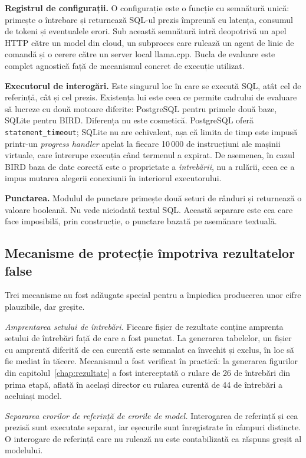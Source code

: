 \documentclass[12pt,a4paper]{report}
\newcommand{\code}[1]{\texttt{\small #1}}
\begin{document}
\textbf{Registrul de configurații.} O configurație este o funcție cu semnătură unică:
primește o întrebare și returnează SQL-ul prezis împreună cu latența,
consumul de tokeni și eventualele erori. Sub această semnătură intră
deopotrivă un apel HTTP către un model din cloud, un subproces care
rulează un agent de linie de comandă și o cerere către un server local
llama.cpp. Bucla de evaluare este complet agnostică față de mecanismul concret de execuție utilizat.

\textbf{Executorul de interogări.} Este singurul loc în care se execută SQL,
atât cel de referință, cât și cel prezis. Existența lui este ceea ce permite
cadrului de evaluare să lucreze cu două motoare diferite: PostgreSQL pentru
primele două baze, SQLite pentru BIRD. Diferența nu este cosmetică. PostgreSQL
oferă \code{statement\_timeout}; SQLite nu are echivalent, așa că limita de
timp este impusă printr-un \emph{progress handler} apelat la fiecare 10\,000 de
instrucțiuni ale mașinii virtuale, care întrerupe execuția când termenul a
expirat. De asemenea, în cazul BIRD baza de date corectă este o proprietate
a \emph{întrebării}, nu a rulării, ceea ce a impus mutarea alegerii
conexiunii în interiorul executorului.

\textbf{Punctarea.} Modulul de punctare primește două seturi de rânduri și
returnează o valoare booleană. Nu vede niciodată textul SQL. Această
separare este cea care face imposibilă, prin construcție, o punctare bazată
pe asemănare textuală.

\subsection{Mecanisme de protecție împotriva rezultatelor false}

Trei mecanisme au fost adăugate special pentru a împiedica producerea unor
cifre plauzibile, dar greșite.

\emph{Amprentarea setului de întrebări.} Fiecare fișier de rezultate
conține amprenta setului de întrebări față de care a fost punctat. La generarea
tabelelor, un fișier cu amprentă diferită de cea curentă este semnalat ca
învechit și exclus, în loc să fie mediat în tăcere. Mecanismul a fost
verificat în practică: la generarea figurilor din capitolul~\ref{chap:rezultate} a fost
interceptată o rulare de 26 de întrebări din prima etapă, aflată în același
director cu rularea curentă de 44 de întrebări a aceluiași model.

\emph{Separarea erorilor de referință de erorile de model.} Interogarea de
referință și cea prezisă sunt executate separat, iar eșecurile sunt
înregistrate în câmpuri distincte. O interogare de referință care nu rulează
nu este contabilizată ca răspuns greșit al modelului.
\end{document}
